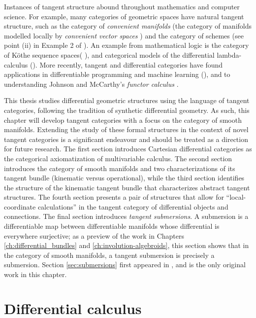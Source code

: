 Instances of tangent structure abound throughout mathematics and computer science. For example,  many categories of geometric spaces have natural tangent structure, such as the category of \emph{convenient manifolds} (the category of manifolds modelled locally by \emph{convenient vector spaces} \cite{Kriegl1997}) and the category of schemes (see point (ii) in Example 2 of \cite{Garner2018}). An example from mathematical logic is the category of K\"{o}the sequence spaces( \cite{MR1934421}), and categorical models of the differential lambda-calculus (\cite{MR4037417}). More recently, tangent and differential categories have found applications in differentiable programming and machine learning (\cite{wilson2021reverse}), and to understanding Johnson and McCarthy's \emph{functor calculus} \cite{Bauer2016}.

This thesis studies differential geometric structures using the language of tangent categories, following the tradition of synthetic differential geometry. As such, this chapter will develop tangent categories with a focus on the category of smooth manifolds. Extending the study of these formal structures in the context of novel tangent categories is a significant endeavour and should be treated as a direction for future research. The first section introduces Cartesian differential categories as the categorical axiomatization of multivariable calculus. The second section introduces the category of smooth manifolds and two characterizations of its tangent bundle (kinematic versus operational),  while the third section identifies the structure of the kinematic tangent bundle that characterizes abstract tangent structures. The fourth section presents a pair of structures that allow for ``local-coordinate calculations'' in the tangent category of differential objects and connections. The final section introduces \emph{tangent submersions}. A submersion is a differentiable map between differentiable manifolds whose differential is everywhere surjective; as a preview of the work in Chapters \ref{ch:differential_bundles} and \ref{ch:involution-algebroids}, this section shows that in the category of smooth manifolds, a tangent submersion is precisely a submersion. Section \ref{sec:submersions} first appeared in \cite{MacAdam2021}, and is the only original work in this chapter.


\section{Differential calculus}%
\label{sec:differential-calculus}


